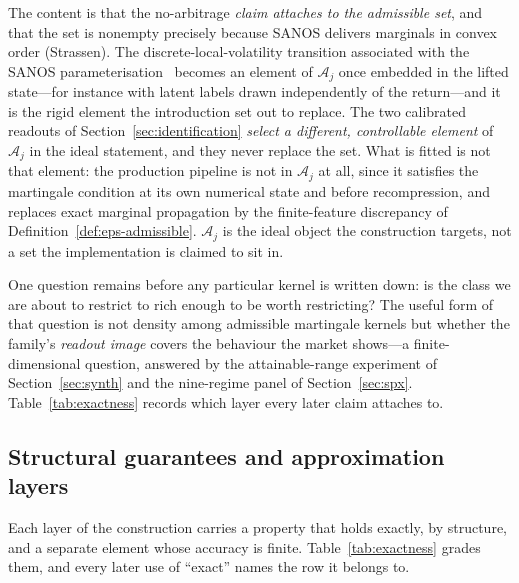 \documentclass[11pt]{article}
\newcommand{\cA}{\mathcal{A}}
\providecommand{\1}{\mathbf 1}
\begin{document}
\noindent The content is that the
no-arbitrage \emph{claim attaches to the admissible set}, and that the set is nonempty
precisely because SANOS delivers marginals in convex order (Strassen). The discrete-local-volatility transition associated with the SANOS
parameterisation~\cite{buehler2026sanos} becomes an element of $\cA_j$ once embedded in the
lifted state---for instance with latent labels drawn independently of the return---and it is
the rigid element the introduction set out to replace. The two calibrated readouts of
Section~\ref{sec:identification} \emph{select a different, controllable element} of $\cA_j$ in the
ideal statement, and they never replace the set. What is fitted is not that element: the production
pipeline is not in $\cA_j$ at all, since it satisfies
the martingale condition at its own numerical state and before recompression, and replaces exact
marginal propagation by the finite-feature discrepancy of
Definition~\ref{def:eps-admissible}. $\cA_j$ is the ideal object the construction targets, not a set
the implementation is claimed to sit in.

One question remains before any particular kernel is written down: is the class we are about to
restrict to rich enough to be worth restricting? The useful form of that question is not density
among admissible martingale kernels but whether the family's \emph{readout image} covers the
behaviour the market shows---a finite-dimensional question, answered by the attainable-range
experiment of Section~\ref{sec:synth} and the nine-regime panel of Section~\ref{sec:spx}.
Table~\ref{tab:exactness} records which layer every later claim attaches to.

\subsection{Structural guarantees and approximation layers}
\label{sec:exactness}

Each layer of the construction carries a property that holds exactly, by structure, and a
separate element whose accuracy is finite. Table~\ref{tab:exactness} grades them, and every later
use of ``exact'' names the row it belongs to.
\end{document}
